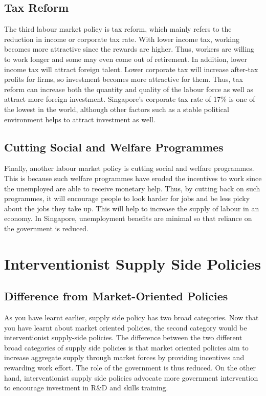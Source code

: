 \subsection{Tax Reform}
The third labour market policy is tax reform, which mainly refers to the reduction in income or corporate tax rate. With lower income tax, working becomes more attractive since the rewards are higher. Thus, workers are willing to work longer and some may even come out of retirement. In addition, lower income tax will attract foreign talent. Lower corporate tax will increase after-tax profits for firms, so investment becomes more attractive for them. Thus, tax reform can increase both the quantity and quality of the labour force as well as attract more foreign investment. Singapore's corporate tax rate of 17\% is one of the lowest in the world, although other factors such as a stable political environment helps to attract investment as well.
\subsection{Cutting Social and Welfare Programmes}
Finally, another labour market policy is cutting social and welfare programmes. This is because such welfare programmes have eroded the incentives to work since the unemployed are able to receive monetary help. Thus, by cutting back on such programmes, it will encourage people to look harder for jobs and be less picky about the jobs they take up. This will help to increase the supply of labour in an economy. In Singapore, unemployment benefits are minimal so that reliance on the government is reduced.
\section{Interventionist Supply Side Policies}
\subsection{Difference from Market-Oriented Policies}
As you have learnt earlier, supply side policy has two broad categories. Now that you have learnt about market oriented policies, the second category would be interventionist supply-side policies. The difference between the two different broad categories of supply side policies is that market oriented policies aim to increase aggregate supply through market forces by providing incentives and rewarding work effort. The role of the government is thus reduced. On the other hand, interventionist supply side policies advocate more government intervention to encourage investment in R\&D and skills training.

